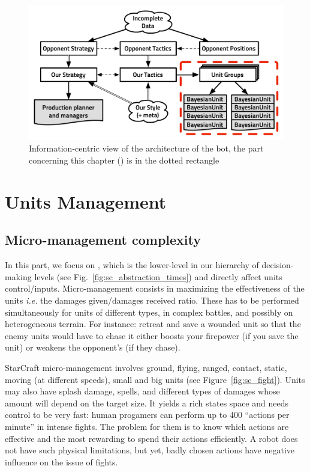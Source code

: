 
\begin{figure}[ht]
\begin{center}
\includegraphics[width=0.84\columnwidth]{images/starcraft_bbq_concept_MICRO.pdf}
\end{center}
\caption{Information-centric view of the architecture of the bot, the part concerning this chapter () is in the dotted rectangle}
\label{fig:conceptMICRO}
\end{figure}

\section{Units Management}
\subsection{Micro-management complexity}
In this part, we focus on , which is the lower-level in our hierarchy of decision-making levels (see Fig.~\ref{fig:sc_abstraction_times}) and directly affect units control/inputs. Micro-management consists in maximizing the effectiveness of the units \textit{i.e.} the damages given/damages received ratio. These has to be performed simultaneously for units of different types, in complex battles, and possibly on heterogeneous terrain. 
For instance: retreat and save a wounded unit so that the enemy units would have to chase it either boosts your firepower (if you save the unit) or weakens the opponent's (if they chase). 

StarCraft micro-management involves ground, flying, ranged, contact, static, moving (at different speeds), small and big units (see Figure~\ref{fig:sc_fight}). Units may also have splash damage, spells, and different types of damages whose amount will depend on the target size. It yields a rich states space and needs control to be very fast: human progamers can perform up to 400 ``actions per minute'' in intense fights. The problem for them is to know which actions are effective and the most rewarding to spend their actions efficiently. A robot does not have such physical limitations, but yet, badly chosen actions have negative influence on the issue of fights. %

